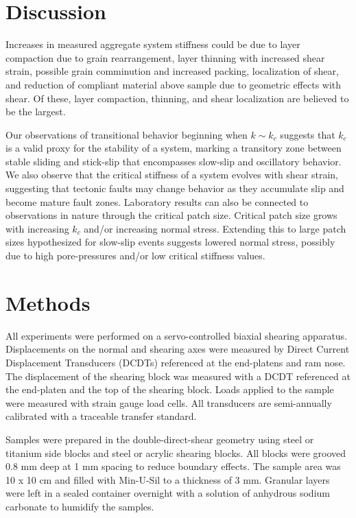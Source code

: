 \documentclass[11pt]{article}
\begin{document}
\section{Discussion}
Increases in measured aggregate system stiffness could be due to layer
compaction due to grain rearrangement, layer thinning with increased shear
strain, possible grain comminution and increased packing, localization of shear,
and reduction of compliant material above sample due to geometric effects with
shear. Of these, layer compaction, thinning, and shear localization are believed
to be the largest.  

Our observations of transitional behavior beginning when $k \sim k_c$ suggests
that $k_c$ is a valid proxy for the stability of a system, marking a transitory
zone between stable sliding and stick-slip that encompasses slow-slip and
oscillatory behavior. We also observe that the critical stiffness of a system
evolves with shear strain, suggesting that tectonic faults may change behavior
as they accumulate slip and become mature fault zones. Laboratory results can
also be connected to observations in nature through the critical patch size.
Critical patch size grows with increasing $k_c$ and/or increasing normal stress.
Extending this to large patch sizes hypothesized for slow-slip events suggests
lowered normal stress, possibly due to high pore-pressures and/or low critical
stiffness values.

\section{Methods}
All experiments were performed on a servo-controlled biaxial shearing apparatus.
Displacements on the normal and shearing axes were measured by Direct Current
Displacement Transducers (DCDTs) referenced at the end-platens and ram nose. The
displacement of the shearing block was measured with a DCDT referenced at the
end-platen and the top of the shearing block. Loads applied to the sample were
measured with strain gauge load cells. All transducers are semi-annually
calibrated with a traceable transfer standard.

Samples were prepared in the double-direct-shear geometry using steel or
titanium side blocks and steel or acrylic shearing blocks. All blocks were
grooved 0.8 mm deep at 1 mm spacing to reduce boundary effects. The sample area
was 10 x 10 cm and filled with Min-U-Sil to a thickness of 3 mm. Granular layers
were left in a sealed container overnight with a solution of anhydrous sodium
carbonate to humidify the samples.
\end{document}
